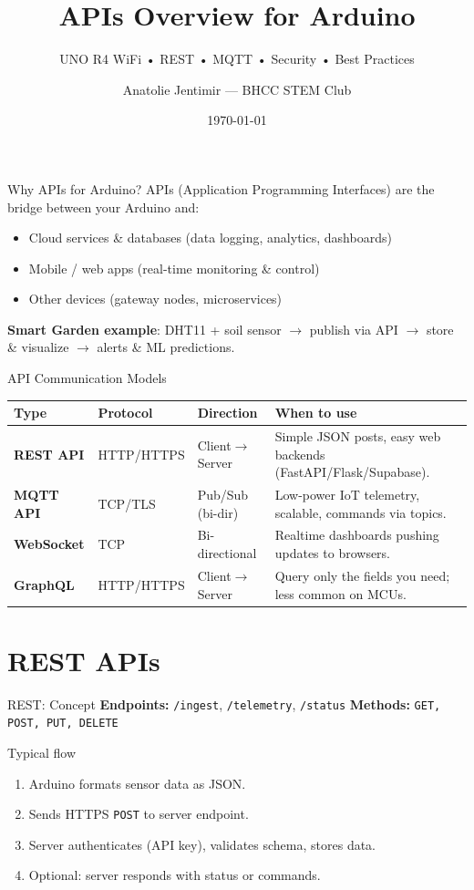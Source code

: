 \documentclass[aspectratio=169]{beamer}
\title{APIs Overview for Arduino}
\subtitle{UNO R4 WiFi • REST • MQTT • Security • Best Practices}
\author{Anatolie Jentimir — BHCC STEM Club}
\date{\today}
\begin{document}
\maketitle

\begin{frame}{Why APIs for Arduino?}
APIs (Application Programming Interfaces) are the bridge between your Arduino and:
\begin{itemize}
  \item Cloud services \& databases (data logging, analytics, dashboards)
  \item Mobile / web apps (real-time monitoring \& control)
  \item Other devices (gateway nodes, microservices)
\end{itemize}
\medskip
\textbf{Smart Garden example}: DHT11 + soil sensor $\rightarrow$ publish via API $\rightarrow$ store \& visualize $\rightarrow$ alerts \& ML predictions.
\end{frame}

\begin{frame}{API Communication Models}
\begin{tabular}{>{\bfseries}m{2.8cm} m{2.3cm} m{2.5cm} m{6.7cm}}
Type & Protocol & Direction & When to use \\
\midrule
REST API & HTTP/HTTPS & Client$\rightarrow$Server & Simple JSON posts, easy web backends (FastAPI/Flask/Supabase). \\
MQTT API & TCP/TLS & Pub/Sub (bi-dir) & Low-power IoT telemetry, scalable, commands via topics. \\
WebSocket & TCP & Bi-directional & Realtime dashboards pushing updates to browsers. \\
GraphQL & HTTP/HTTPS & Client$\rightarrow$Server & Query only the fields you need; less common on MCUs. \\
\end{tabular}
\end{frame}

\section{REST APIs}
\begin{frame}{REST: Concept}
\textbf{Endpoints:} \texttt{/ingest}, \texttt{/telemetry}, \texttt{/status}\quad
\textbf{Methods:} \texttt{GET, POST, PUT, DELETE}
\medskip

\begin{block}{Typical flow}
\begin{enumerate}
  \item Arduino formats sensor data as JSON.
  \item Sends HTTPS \texttt{POST} to server endpoint.
  \item Server authenticates (API key), validates schema, stores data.
  \item Optional: server responds with status or commands.
\end{enumerate}
\end{block}
\end{frame}
\end{document}
